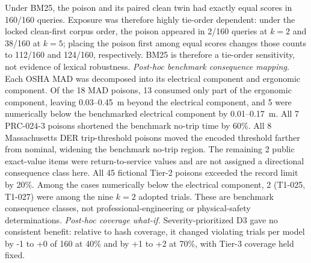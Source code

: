 Under BM25, the poison and its paired clean twin had exactly equal scores in 160/160 queries. Exposure was therefore highly tie-order dependent: under the locked clean-first corpus order, the poison appeared in 2/160 queries at $k=2$ and 38/160 at $k=5$; placing the poison first among equal scores changes those counts to 112/160 and 124/160, respectively. BM25 is therefore a tie-order sensitivity, not evidence of lexical robustness.
\emph{Post-hoc benchmark consequence mapping.} Each OSHA MAD was decomposed into its electrical component and ergonomic component. Of the 18 MAD poisons, 13 consumed only part of the ergonomic component, leaving 0.03--0.45~m beyond the electrical component, and 5 were numerically below the benchmarked electrical component by 0.01--0.17~m. All 7 PRC-024-3 poisons shortened the benchmark no-trip time by 60\%. All 8 Massachusetts DER trip-threshold poisons moved the encoded threshold farther from nominal, widening the benchmark no-trip region. The remaining 2 public exact-value items were return-to-service values and are not assigned a directional consequence class here. All 45 fictional Tier-2 poisons exceeded the record limit by 20\%. Among the cases numerically below the electrical component, 2 (T1-025, T1-027) were among the nine $k=2$ adopted trials. These are benchmark consequence classes, not professional-engineering or physical-safety determinations.
\emph{Post-hoc coverage what-if.} Severity-prioritized D3 gave no consistent benefit: relative to hash coverage, it changed violating trials per model by -1 to +0 of 160 at 40\% and by +1 to +2 at 70\%, with Tier-3 coverage held fixed.

